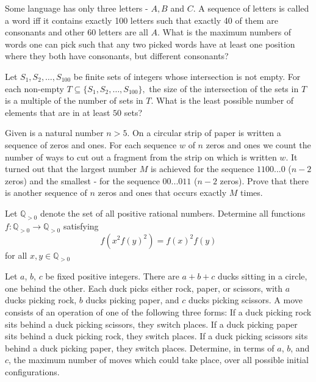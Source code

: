 \documentclass[11pt]{scrartcl}
\begin{document}
\begin{problem}[1736102587052874498]
Some language has only three letters - $A, B$ and $C$. A sequence of letters is called a word iff it contains exactly 100 letters such that exactly 40 of them are consonants and other 60 letters are all $A$. What is the maximum numbers of words one can pick such that any two picked words have at least one position where they both have consonants, but different consonants?
\end{problem}
\begin{problem}[1978345856029698287]
Let $S_1, S_2, \ldots, S_{100}$ be finite sets of integers whose intersection is not empty. For each non-empty $T \subseteq \{S_1, S_2, \ldots, S_{100}\},$ the size of the intersection of the sets in $T$ is a multiple of the number of sets in $T$. What is the least possible number of elements that are in at least $50$ sets?
\end{problem}
\begin{problem}[314213229221479]
	Given is a natural number $n > 5$. On a circular strip of paper is written a sequence of zeros and ones. For each sequence $w$ of $n$ zeros and ones we count the number of ways to cut out a fragment from the strip on which is written $w$. It turned out that the largest number $M$ is achieved for the sequence $11 00...0$ ($n-2$ zeros) and the smallest - for the sequence $00...011$ ($n-2$ zeros). Prove that there is another sequence of $n$ zeros and ones that occurs exactly $M$ times.
\end{problem}
\begin{problem}[8782897210450267045]
Let $\mathbb{Q}_{>0}$ denote the set of all positive rational numbers. Determine all functions $f:\mathbb{Q}_{>0}\to \mathbb{Q}_{>0}$ satisfying$$f(x^2f(y)^2)=f(x)^2f(y)$$for all $x,y\in\mathbb{Q}_{>0}$
\end{problem}
\begin{problem}[1634257707699822785]
Let $a$, $b$, $c$ be fixed positive integers. There are $a+b+c$ ducks sitting in a
circle, one behind the other. Each duck picks either rock, paper, or scissors, with $a$ ducks
picking rock, $b$ ducks picking paper, and $c$ ducks picking scissors.
A move consists of an operation of one of the following three forms:
If a duck picking rock sits behind a duck picking scissors, they switch places.
If a duck picking paper sits behind a duck picking rock, they switch places.
If a duck picking scissors sits behind a duck picking paper, they switch places.
Determine, in terms of $a$, $b$, and $c$, the maximum number of moves which could take
place, over all possible initial configurations.
\end{problem}
\end{document}
